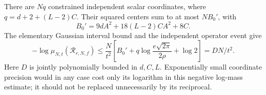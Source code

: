 There are $Nq$ constrained independent scalar coordinates, where
$q=d+2+(L-2)C$. Their squared centers sum to at most $NB_0'$, with
\[
 B_0'=9dA^2+18(L-2)CA^2+8C.
\]
The elementary Gaussian interval bound and the independent operator event give
\[
 -\log\mu_{N,t}(\mathcal R_{r,N,f})
 \le \frac{N}{t^2}\left[B_0'+q\log\frac{e\sqrt{2\pi}}{2\rho}+\log2\right]
 =DN/t^2.
\]
Here $D$ is jointly polynomially bounded in $d,C,L$. Exponentially small
coordinate precision would in any case cost only its logarithm in this
negative log-mass estimate; it should not be replaced unnecessarily by its
reciprocal.

